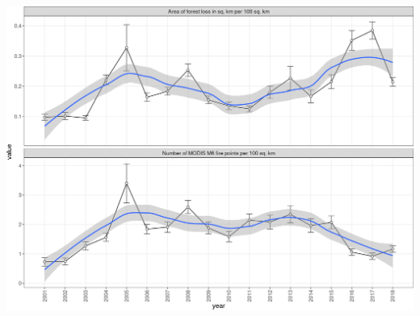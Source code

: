 \documentclass[10pt,landscape,a3paper]{article}
\begin{document}
\begin{center}\includegraphics{img/modelling/aa-eda-ts-21} \end{center}
\end{document}
